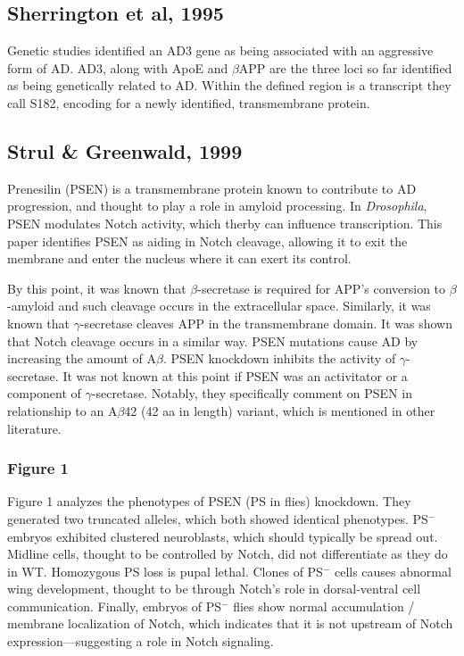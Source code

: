 \documentclass[12pt]{report}
\newcommand{\be}{\beta}
\newcommand{\ga}{\gamma}
\begin{document}
\subsection*{Sherrington et al, 1995}

Genetic studies identified an AD3 gene as being associated with an aggressive form of AD. AD3, along with ApoE and $\beta$APP are the three loci so far identified as being genetically related to AD. Within the defined region is a transcript they call S182, encoding for a newly identified, transmembrane protein.\newline




\subsection*{Strul \& Greenwald, 1999}

Prenesilin (PSEN) is a transmembrane protein known to contribute to AD progression, and thought to play a role in amyloid processing. In \textit{Drosophila}, PSEN modulates Notch activity, which therby can influence transcription. This paper identifies PSEN as aiding in Notch cleavage, allowing it to exit the membrane and enter the nucleus where it can exert its control.\newline

By this point, it was known that $\beta$-secretase is required for APP's conversion to $\beta$-amyloid and such cleavage occurs in the extracellular space. Similarly, it was known that $\ga$-secretase cleaves APP in the transmembrane domain. It was shown that Notch cleavage occurs in a similar way. PSEN mutations cause AD by increasing the amount of A$\be$. PSEN knockdown inhibits the activity of $\ga$-secretase. It was not known at this point if PSEN was an activitator or a component of $\ga$-secretase. Notably, they specifically comment on PSEN in relationship to an A$\be$42 (42 aa in length) variant, which is mentioned in other literature. 

\subsubsection*{Figure 1} Figure 1 analyzes the phenotypes of PSEN (PS in flies) knockdown. They generated two truncated alleles, which both showed identical phenotypes. PS$^-$ embryos exhibited clustered neuroblasts, which should typically be spread out. Midline cells, thought to be controlled by Notch, did not differentiate as they do in WT. Homozygous PS loss is pupal lethal. Clones of PS$^-$ cells causes abnormal wing development, thought to be through Notch's role in dorsal-ventral cell communication. Finally, embryos of PS$^-$ flies show normal accumulation / membrane localization of Notch, which indicates that it is not upstream of Notch expression---suggesting a role in Notch signaling. 
\end{document}
